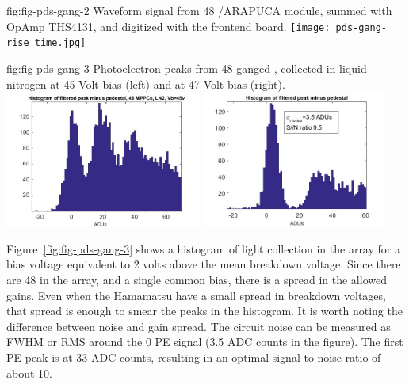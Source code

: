 \begin{dunefigure}
 {fig:fig-pds-gang-2}
 {Waveform signal from 48 /ARAPUCA module, summed with OpAmp THS4131, and digitized with the  frontend board.}
\texttt{[image: pds-gang-rise\_time.jpg]}
\end{dunefigure}


\begin{dunefigure}
 {fig:fig-pds-gang-3}
 {Photoelectron peaks from 48 ganged , collected in liquid nitrogen at 45 Volt bias (left) and at 47 Volt bias (right).}
\includegraphics[height=4.5cm]{graphics/pds-gang48-45v.jpg}
\includegraphics[height=4.5cm]{graphics/pds-gang48-47v.jpg}
\end{dunefigure}

Figure~\ref{fig:fig-pds-gang-3} shows a histogram of light collection in the array for a bias voltage equivalent to 2 volts above the mean breakdown voltage. Since there are 48  in the array, and a single common bias, there is a spread in the allowed gains. Even when the Hamamatsu  have a small spread in breakdown voltages, that spread is enough to smear the peaks in the histogram. It is worth noting the difference between noise and gain spread. The circuit noise can be measured as FWHM or RMS around the 0 PE signal (3.5 ADC counts in the figure). The first PE peak is at 33 ADC counts, resulting in an optimal signal to noise ratio of about 10.

